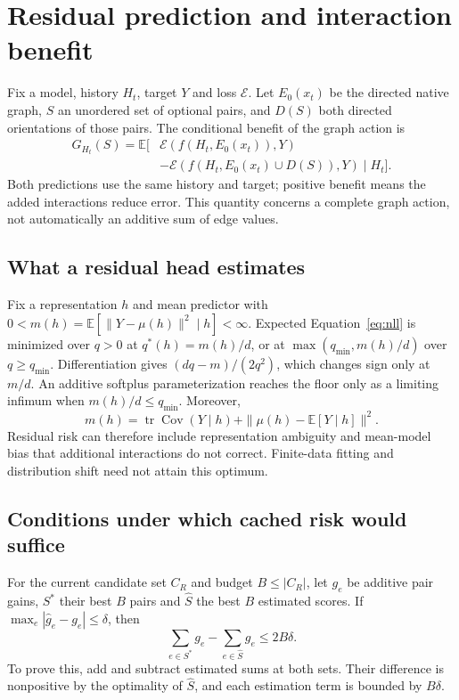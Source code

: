 \section{Residual prediction and interaction benefit}
\label{sec:benefit-derivations}
Fix a model, history $H_t$, target $Y$ and loss $\mathcal E$. Let $E_0(x_t)$ be the directed native graph, $S$ an unordered set of optional pairs, and $D(S)$ both directed orientations of those pairs. The conditional benefit of the graph action is
\begin{align}
 G_{H_t}(S)=\mathbb E[&\mathcal E(f(H_t,E_0(x_t)),Y)\nonumber\\
              &-\mathcal E(f(H_t,E_0(x_t)\cup D(S)),Y)\mid H_t].
 \label{eq:conditional-benefit}
\end{align}
Both predictions use the same history and target; positive benefit means the added interactions reduce error. This quantity concerns a complete graph action, not automatically an additive sum of edge values.

\subsection{What a residual head estimates}
\label{sec:residual-moment}
Fix a representation $h$ and mean predictor with $0<m(h)=\mathbb E[\|Y-\mu(h)\|^2\mid h]<\infty$. Expected Equation~\ref{eq:nll} is minimized over $q>0$ at $q^*(h)=m(h)/d$, or at $\max(q_{\min},m(h)/d)$ over $q\ge q_{\min}$. Differentiation gives $(dq-m)/(2q^2)$, which changes sign only at $m/d$. An additive softplus parameterization reaches the floor only as a limiting infimum when $m(h)/d\le q_{\min}$. Moreover,
\begin{equation}
 m(h)=\operatorname{tr}\operatorname{Cov}(Y\mid h)+\|\mu(h)-\mathbb E[Y\mid h]\|^2.
\end{equation}
Residual risk can therefore include representation ambiguity and mean-model bias that additional interactions do not correct. Finite-data fitting and distribution shift need not attain this optimum.

\subsection{Conditions under which cached risk would suffice}
\label{sec:allocation-score-conditions}
For the current candidate set $C_R$ and budget $B\le|C_R|$, let $g_e$ be additive pair gains, $S^*$ their best $B$ pairs and $\widehat S$ the best $B$ estimated scores. If $\max_e|\widehat g_e-g_e|\le\delta$, then
\begin{equation}
 \sum_{e\in S^*}g_e-\sum_{e\in\widehat S}g_e\le2B\delta.
 \label{eq:regret}
\end{equation}
To prove this, add and subtract estimated sums at both sets. Their difference is nonpositive by the optimality of $\widehat S$, and each estimation term is bounded by $B\delta$.

